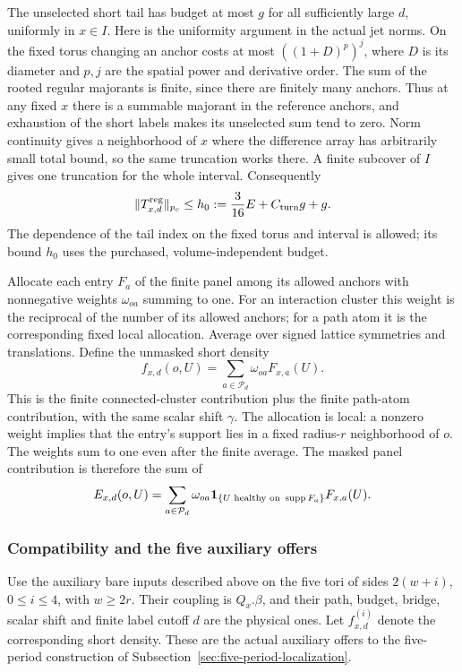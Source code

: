 The unselected short tail has budget at most $g$ for all sufficiently
large $d$, uniformly in $x\in I$. Here is the uniformity argument in
the actual jet norms. On the fixed torus changing an anchor costs at
most $((1+D)^p)^j$, where $D$ is its diameter and $p,j$ are the
spatial power and derivative order. The sum of the rooted regular
majorants is finite, since there are finitely many anchors. Thus at
any fixed $x$ there is a summable majorant in the reference anchors,
and exhaustion of the short labels makes its unselected sum tend to
zero. Norm continuity gives a neighborhood of $x$ where the difference
array has arbitrarily small total bound, so the same truncation works
there. A finite subcover of $I$ gives one truncation for the whole
interval. Consequently
\begin{equation}\label{eq:selected-offer-truncation}
 \|T_{x,d}^{\rm reg}\|_{p_c}
       \le h_0:=\frac3{16}E+C_{\rm turn}g+g.
\end{equation}
The dependence of the tail index on the fixed torus and interval is
allowed; its bound $h_0$ uses the purchased, volume-independent budget.

Allocate each entry $F_a$ of the finite panel among its allowed
anchors with nonnegative weights $\omega_{oa}$ summing to one. For
an interaction cluster this weight is the reciprocal of the number
of its allowed anchors; for a path atom it is the corresponding
fixed local allocation. Average over signed lattice symmetries and
translations. Define the unmasked short density
\[
                   f_{x,d}(o,U)=\sum_{a\in\mathcal P_d}
                                      \omega_{oa}F_{x,a}(U).
\]
This is the finite connected-cluster contribution plus the finite
path-atom contribution, with the same scalar shift $\gamma$.
The allocation is local: a nonzero weight implies that the entry's
support lies in a fixed radius-$r$ neighborhood of $o$. The weights
sum to one even after the finite average. The masked panel contribution
is therefore the sum of
\[
 E_{x,d}(o,U)=\sum_{a\in\mathcal P_d}\omega_{oa}
             {\bf1}_{\{U\text{ healthy on }\operatorname{supp}F_a\}}
                                                       F_{x,a}(U).
\]

\subsubsection{Compatibility and the five auxiliary offers}
Use the auxiliary bare inputs described above on the five tori of
sides $2(w+i)$, $0\le i\le4$, with $w\ge2r$. Their coupling is
$Q_x.\beta$, and their path, budget, bridge, scalar shift and finite
label cutoff $d$ are the physical ones. Let $f^{(i)}_{x,d}$ denote
the corresponding short density. These are the actual auxiliary
offers to the five-period construction of
Subsection~\ref{sec:five-period-localization}.

